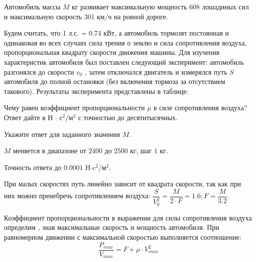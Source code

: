
Автомобиль массы $M$ кг развивает максимальную мощность 608 лошадиных сил и максимальную скорость
301 км/ч на ровной дороге. 

Будем считать, что 1 л.с. = 0.74  кВт, а автомобиль тормозят постоянная и одинаковая во всех случаях сила трения о землю и сила сопротивления воздуха, пропорциональная квадрату скорости
движения машины. Для изучения характеристик автомобиля был поставлен следующий
эксперимент: автомобиль разгонялся до скорости $v_0$ , затем отключался двигатель и измерялся путь $S$ 
автомобиля до полной остановки (без включения тормоза за отсутствием такового).
Результаты эксперимента представлены в таблице:


Чему равен коэффициент пропорциональности $\mu$ в
силе сопротивления воздуха? Ответ дайте в Н $\cdot$ с$^2/$м$^2$ с точностью до десятитысячных.

Укажите ответ для заданного значения $M$.

\paramSection

$M$ меняется в диапазоне от $2400$ до $2500$ кг, шаг $1$ кг.

Точность ответа до  $0.0001$  H$\cdot$c$^2$/м$^2$.

\solutionSection

При малых скоростях путь линейно зависит от квадрата скорости, так как при них можно пренебречь сопротивлением воздуха: 
$\dfrac{S}{V_0^2} = \dfrac{M}{2 \cdot F}=1.6;  F=\dfrac{M}{3.2}.$ 

Коэффициент пропорциональности в выражении для силы сопротивления воздуха определим , зная максимальные скорость и мощность автомобиля. 
При  равномерном движении с максимальной скоростью выполняется соотношение:   $$\dfrac{P_{max}}{V_{max}} =F+\mu \cdot V_{max}^2 $$

